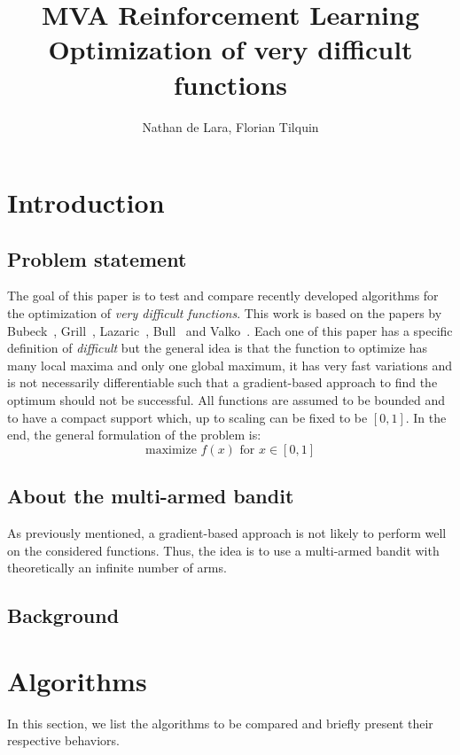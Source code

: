 \documentclass[a4paper,10pt]{article}
\begin{document}
\title{MVA Reinforcement Learning\\
Optimization of very difficult functions}

\author{Nathan de Lara, Florian Tilquin}
\maketitle

\section{Introduction}
\subsection{Problem statement}
The goal of this paper is to test and compare recently developed algorithms for the optimization of \textit{very difficult functions}. This work is based on the papers by Bubeck~\cite{bubeck2011x}, Grill~\cite{grill2015black}, Lazaric~\cite{azar2014online}, Bull~\cite{bull2013adaptive} and Valko~\cite{valko2013stochastic}. Each one of this paper has a specific definition of \textit{difficult} but the general idea is that the function to optimize has many local maxima and only one global maximum, it has very fast variations and is not necessarily differentiable such that a gradient-based approach to find the optimum should not be successful. All functions are assumed to be bounded and to have a compact support which, up to scaling can be fixed to be $[0,1]$. In the end, the general formulation of the problem is:
\begin{equation}
\mbox{maximize } f(x) \mbox{ for } x\in [0,1]
\end{equation}

\subsection{About the multi-armed bandit}
As previously mentioned, a gradient-based approach is not likely to perform well on the considered functions. Thus, the idea is to use a multi-armed bandit with theoretically an infinite number of arms.

\subsection{Background}

\section{Algorithms}
\label{algo}
In this section, we list the algorithms to be compared and briefly present their respective behaviors.
\end{document}
